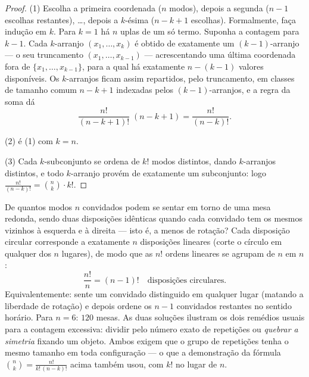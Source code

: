 \begin{proof}
(1) Escolha a primeira coordenada ($n$ modos), depois a segunda ($n - 1$
escolhas restantes), \dots, depois a $k$-ésima ($n - k + 1$ escolhas).
Formalmente, faça indução em $k$. Para $k = 1$ há $n$ uplas  de
um só termo. Suponha a contagem para $k - 1$. Cada
$k$-arranjo $(x_1, \dots, x_k)$ é obtido de exatamente um
$(k-1)$-arranjo --- o seu truncamento $(x_1, \dots, x_{k-1})$ ---
acrescentando uma última coordenada fora de $\{x_1, \dots,
x_{k-1}\}$, para a qual há exatamente $n - (k - 1)$ valores disponíveis.
Os $k$-arranjos ficam assim repartidos, pelo truncamento, em
classes de tamanho comum $n - k + 1$ indexadas pelos
$(k-1)$-arranjos, e a regra da soma dá
\[
\frac{n!}{(n-k+1)!}\;(n - k + 1) = \frac{n!}{(n-k)!} .
\]

(2) é (1) com $k = n$.

(3) Cada $k$-subconjunto se ordena de $k!$ modos distintos, dando
$k$-arranjos distintos, e todo $k$-arranjo provém de exatamente um
subconjunto: logo $\frac{n!}{(n-k)!} = \binom nk \cdot k!$.
\end{proof}

\begin{example}\label{ex:b1:counting:roundtable}
De quantos modos $n$ convidados podem se sentar em torno de uma mesa
redonda, sendo duas disposições idênticas quando cada convidado tem os
mesmos vizinhos à esquerda e à direita --- isto é, a menos de rotação?
Cada disposição circular corresponde a exatamente $n$ disposições
lineares (corte o círculo em qualquer dos $n$ lugares), de modo que as
$n!$ ordens lineares se agrupam de $n$ em $n$:
\[
\frac{n!}{n} = (n-1)! \quad\text{disposições circulares.}
\]
Equivalentemente: sente um convidado distinguido em qualquer lugar
(matando a liberdade de rotação) e depois ordene os $n - 1$ convidados
restantes no sentido horário. Para $n = 6$: $120$ mesas. As duas
soluções ilustram os dois remédios usuais para a contagem excessiva:
dividir pelo número exato de repetições ou \emph{quebrar a simetria}
fixando um objeto. Ambos exigem que o grupo de repetições tenha o mesmo
tamanho em toda configuração --- o que a demonstração da fórmula
$\binom nk = \frac{n!}{k!\,(n-k)!}$ acima também usou, com $k!$ no lugar de $n$.
\end{example}

